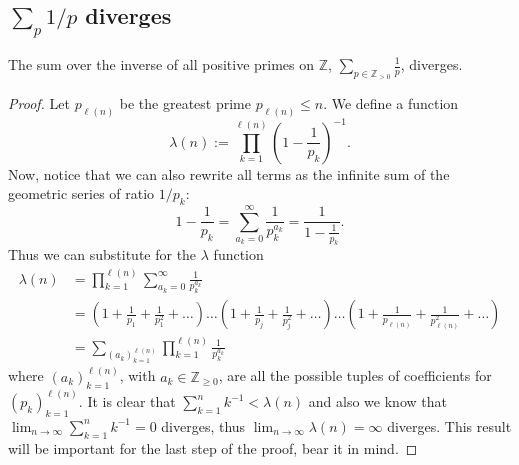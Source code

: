 \subsection{\texorpdfstring{\(\sum_p 1/p\)}{1/p} diverges}

\begin{theorem}
    The sum over the inverse of all positive primes on \(\mathbb{Z}\), \(\sum_{p
        \in \mathbb{Z}_{>0}}\frac{1}{p}\), diverges.
\end{theorem}

\begin{proof}
    Let \(p_{\ell(n)}\) be the greatest prime \(p_{\ell(n)} \leqslant n\). We
    define a function
    \[
        \lambda(n) := \prod_{k = 1}^{\ell(n)} \left( 1 - \frac{1}{p_k}\right)^{-1}.
    \]
    Now, notice that we can also rewrite all terms as the infinite sum of the
    geometric series of ratio \(1/p_k\):
    \[
        1 - \frac{1}{p_k} = \sum_{a_k = 0}^{\infty}\frac{1}{p_k^{a_k}} =
        \frac{1}{1 - \frac{1}{p_k}}.
    \]
    Thus we can substitute for the \(\lambda\) function
    \begin{align*}
        \lambda(n)
         & = \prod_{k=1}^{\ell(n)} \sum_{a_k = 0}^\infty \frac{1}{p_k^{a_k}}
        \\
         & = \left( 1 + \frac{1}{p_1} + \frac{1}{p_1^2} + \dots \right)  \dots
        \left( 1 + \frac{1}{p_j} + \frac{1}{p_j^2} + \dots \right) \dots \left( 1
        + \frac{1}{p_{\ell(n)}} + \frac{1}{p_{\ell(n)}^2} + \dots \right)
        \\
         & = \sum_{(a_k)_{k=1}^{\ell(n)}} \prod_{k = 1}^{\ell(n)} \frac{1}{p_k^{a_k}}
    \end{align*}
    where \(\left( a_k \right)_{k = 1}^{\ell(n)}\), with \(a_k \in
    \mathbb{Z}_{\geqslant 0}\), are all the possible tuples of coefficients for
    \(\left( p_k \right)_{k = 1}^{\ell(n)}\). It is clear that \(\sum_{k=1}^n
    k^{-1} < \lambda(n)\) and also we know that \(\lim_{n \to \infty}
    \sum_{k=1}^n k^{-1} = 0\) diverges, thus \(\lim_{n \to \infty}
    \lambda(n) = \infty\) diverges. This result will be important for the
    last step of the proof, bear it in mind.


\end{proof}
